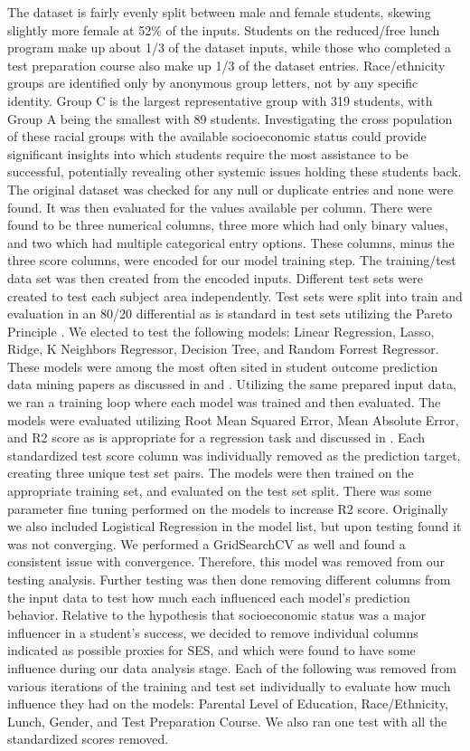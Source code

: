 \documentclass[man,floatsintext]{apa6} %
\begin{document}
The dataset is fairly evenly split between male and female students, skewing slightly more female at 52\% of the inputs. Students on the reduced/free lunch program make up about 1/3 of the dataset inputs, while those who completed a test preparation course also make up 1/3 of the dataset entries. Race/ethnicity groups are identified only by anonymous group letters, not by any specific identity. Group C is the largest representative group with 319 students, with Group A being the smallest with 89 students. Investigating the cross population of these racial groups with the available socioeconomic status could provide significant insights into which students require the most assistance to be successful, potentially revealing other systemic issues holding these students back.
The original dataset was checked for any null or duplicate entries and none were found. It was then evaluated for the values available per column. There were found to be three numerical columns, three more which had only binary values, and two which had multiple categorical entry options. These columns, minus the three score columns, were encoded for our model training step.
The training/test data set was then created from the encoded inputs. Different test sets were created to test each subject area independently. Test sets were split into train and evaluation in an 80/20 differential as is standard in test sets utilizing the Pareto Principle \cite{ParetoSplit}.
We elected to test the following models: Linear Regression, Lasso, Ridge, K Neighbors Regressor, Decision Tree, and Random Forrest Regressor. These models were among the most often sited in student outcome prediction data mining papers as discussed in \cite{MLMoodle} and \cite{dataMineLit}. Utilizing the same prepared input data, we ran a training loop where each model was trained and then evaluated. The models were evaluated utilizing Root Mean Squared Error, Mean Absolute Error, and R2 score as is appropriate for a regression task and discussed in \cite{measuremetrics}.
Each standardized test score column was individually removed as the prediction target, creating three unique test set pairs. The models were then trained on the appropriate training set, and evaluated on the test set split. There was some parameter fine tuning performed on the models to increase R2 score.  Originally we also included Logistical Regression in the model list, but upon testing found it was not converging. We performed a GridSearchCV as well and found a consistent issue with convergence. Therefore, this model was removed from our testing analysis.
Further testing was then done removing different columns from the input data to test how much each influenced each model's prediction behavior. Relative to the hypothesis that socioeconomic status was a major influencer in a student's success, we decided to remove individual columns indicated as possible proxies for SES, and which were found to have some influence during our data analysis stage. Each of the following was removed from various iterations of the training and test set individually to evaluate how much influence they had on the models: Parental Level of Education, Race/Ethnicity, Lunch, Gender, and Test Preparation Course. We also ran one test with all the standardized scores removed.
\end{document}
